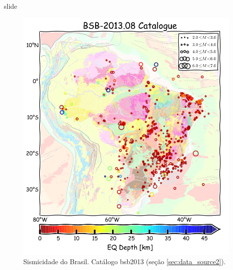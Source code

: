 \documentclass[ucs,8pt]{beamer}
\begin{document}
\begin{frame}{slide}


\begin{figure}[H]
  \centering
  \includegraphics[height=.90\textheight]{seismicity_br} 
  \caption{Sismicidade do Brasil. Catálogo \gls{bsb2013} (seção \ref{sec:data_source2}).}
  \label{fig:br_seis} 
\end{figure}


\end{frame}
\end{document}
